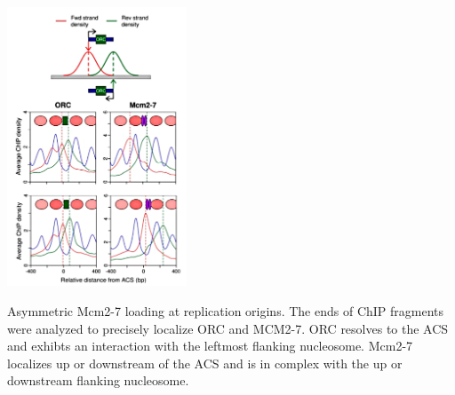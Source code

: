 \begin{floatingfigure}[r]{2.1in}
\vspace{-8mm}
\begin{center}
\includegraphics[width=2.1in]{r35_figures/mcm_histone.png}
\end{center}
\vspace{3mm}
\caption{Asymmetric Mcm2-7 loading at replication origins.  The ends of ChIP fragments were analyzed to precisely localize ORC and MCM2-7.  ORC resolves to the ACS and exhibts an interaction with the leftmost flanking nucleosome.  Mcm2-7 localizes up or downstream of the ACS and is in complex with the up or downstream flanking nucleosome.}%
\end{floatingfigure}%


